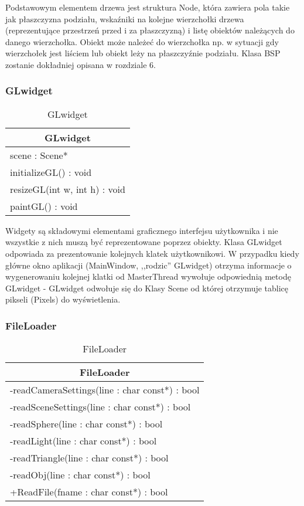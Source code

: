 Podstawowym elementem drzewa jest struktura Node, która zawiera pola takie jak płaszczyzna podziału, wskaźniki na kolejne wierzchołki drzewa (reprezentujące przestrzeń przed i za płaszczyzną) i listę obiektów należących do danego wierzchołka. Obiekt może należeć do wierzchołka np. w sytuacji gdy wierzchołek jest liściem lub obiekt leży na płaszczyźnie podziału. Klasa BSP zostanie dokładniej opisana w rozdziale 6.


\subsubsection{GLwidget}

\footnotesize
\begin{longtable}{|p{14cm}|}
    \caption{GLwidget} \label{tab:GLwidget} \\ \hline
    \multicolumn{1}{|c|}{GLwidget} \\ \hline
    scene : Scene*  \\ \hline
    initializeGL() : void \\ 
    resizeGL(int w, int h) : void \\
    paintGL() : void \\ \hline
\end{longtable}
\normalsize

Widgety są składowymi elementami graficznego interfejsu użytkownika i nie wszystkie z nich muszą być reprezentowane poprzez obiekty. Klasa GLwidget odpowiada za prezentowanie kolejnych klatek użytkownikowi. W przypadku kiedy główne okno aplikacji (MainWindow, ,,rodzic'' GLwidget) otrzyma informacje o wygenerowaniu kolejnej klatki od MasterThread wywołuje odpowiednią metodę GLwidget - GLwidget odwołuje się do Klasy Scene od której otrzymuje tablicę pikseli (Pixels) do wyświetlenia. 

\subsubsection{FileLoader}

\footnotesize
\begin{longtable}{|p{14cm}|}
    \caption{FileLoader} \label{tab:FileLoader} \\ \hline
    \multicolumn{1}{|c|}{FileLoader} \\ \hline
    -readCameraSettings(line : char const*) : bool \\
    -readSceneSettings(line : char const*) : bool \\
    -readSphere(line : char const*) : bool \\
    -readLight(line : char const*) : bool \\
    -readTriangle(line : char const*) : bool \\
    -readObj(line : char const*) : bool \\
	+ReadFile(fname : char const*) : bool \\ \hline
\end{longtable}
\normalsize

